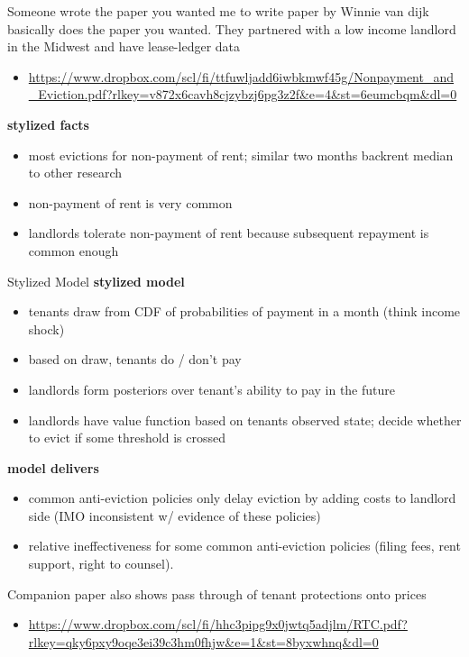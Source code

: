\documentclass[10pt, xcolor=dvipsnames]{beamer}
\begin{document}

\begin{frame}{Someone wrote the paper you wanted me to write}
 paper by Winnie van dijk basically does the paper you wanted. They partnered with a low income landlord in the Midwest and have lease-ledger data 
\begin{itemize}
        \item \url{https://www.dropbox.com/scl/fi/ttfuwljadd6iwbkmwf45g/Nonpayment_and_Eviction.pdf?rlkey=v872x6cavh8cjzybzj6pg3z2f&e=4&st=6eumcbqm&dl=0}
    
\end{itemize}
\textbf{stylized facts}
    \begin{itemize}
        \item most evictions for non-payment of rent; similar two months backrent median to other research
        \item non-payment of rent is very common
        \item landlords tolerate non-payment of rent because subsequent repayment is common enough
    \end{itemize}

\end{frame}

\begin{frame}{Stylized Model}
    \textbf{stylized model}
    \begin{itemize}
        \item tenants draw from CDF of probabilities of payment in a month (think income shock)
        \item based on draw, tenants do / don't pay
        \item landlords form posteriors over tenant's ability to pay in the future
        \item landlords have value function based on tenants observed state;  decide whether to evict if some threshold is crossed
    \end{itemize}
    \textbf{model delivers}
    \begin{itemize}
        \item common anti-eviction policies only delay eviction by adding costs to landlord side (IMO inconsistent w/ evidence of these policies)
        \item relative ineffectiveness for some common anti-eviction policies (filing fees, rent support, right to counsel). 
    \end{itemize}
    Companion paper also shows pass through of tenant protections onto prices
        \begin{itemize}
            \item \url{https://www.dropbox.com/scl/fi/hhc3pipg9x0jwtq5adjlm/RTC.pdf?rlkey=qky6pxy9oqe3ei39c3hm0fhjw&e=1&st=8byxwhnq&dl=0}
        \end{itemize}
\end{frame}
\end{document}

